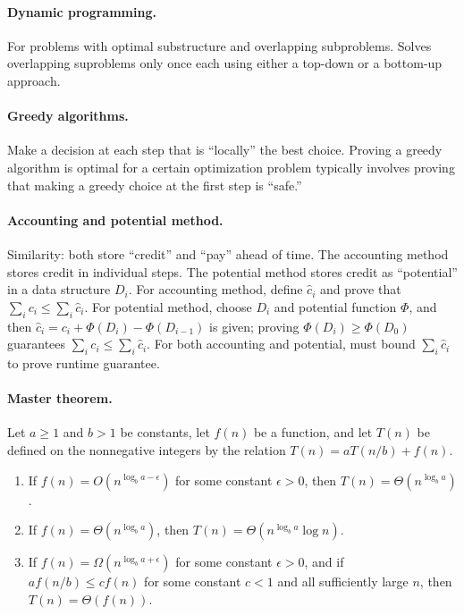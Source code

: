 \documentclass[11  pt]{exam}
\begin{document}
	\paragraph{Dynamic programming.} For problems with optimal substructure and overlapping subproblems. Solves overlapping suproblems only once each using either a top-down or a bottom-up approach.
	\paragraph{Greedy algorithms.} Make a decision at each step that is ``locally'' the best choice. Proving a greedy algorithm is optimal for a certain optimization problem typically involves proving that making a greedy choice at the first step is ``safe.''
	\paragraph{Accounting and potential method.}
	Similarity: both store ``credit'' and ``pay'' ahead of time. The accounting method stores credit in individual steps. The potential method stores credit as ``potential'' in a data structure $D_i$. For accounting method, define $\hat{c}_i$ and prove that $\sum_{i} c_i \leq \sum_i \hat{c}_i$. For potential method, choose $D_i$ and potential function $\Phi$, and then $\hat{c}_i = c_i + \Phi(D_i) - \Phi(D_{i-1})$ is given; proving $\Phi(D_i) \geq \Phi(D_0)$ guarantees $\sum_{i} c_i \leq \sum_i \hat{c}_i$. For both accounting and potential, must bound $\sum_{i} \hat{c}_i$ to prove runtime guarantee.
	
	\paragraph{Master theorem.}
	Let $a \geq 1$ and $b > 1$ be constants, let $f(n)$ be a function, and let $T(n)$ be defined on the nonnegative integers by the relation $T(n) = aT(n/b) + f(n)$.
	\begin{enumerate}
		\item If $f(n) = O(n^{\log_b a - \epsilon})$ for some constant $\epsilon > 0$, then $T(n) = \Theta (n^{\log_b a })$.
		\item If $f(n) = \Theta(n^{\log_b a})$, then $T(n) = \Theta (n^{\log_b a } \log n)$.
		\item If $f(n) = \Omega(n^{\log_b a + \epsilon})$ for some constant $\epsilon > 0$, and if $a f(n/b) \leq c f(n)$ for some constant $c < 1$ and all sufficiently large $n$, then $T(n) = \Theta (f(n))$.
	\end{enumerate}
\end{document}
